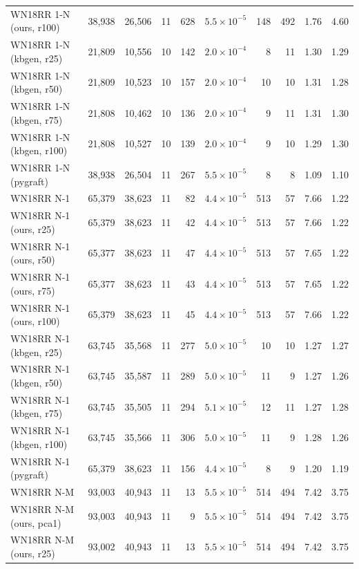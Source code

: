 \begin{tabular}{lrrrrrrrrr}
WN18RR 1-N (ours, r100) & 38{,}938 & 26{,}506 & 11 & 628 & $5.5\times10^{-5}$ & 148 & 492 & 1.76 & 4.60 \\
WN18RR 1-N (kbgen, r25) & 21{,}809 & 10{,}556 & 10 & 142 & $2.0\times10^{-4}$ & 8 & 11 & 1.30 & 1.29 \\
WN18RR 1-N (kbgen, r50) & 21{,}809 & 10{,}523 & 10 & 157 & $2.0\times10^{-4}$ & 10 & 10 & 1.31 & 1.28 \\
WN18RR 1-N (kbgen, r75) & 21{,}808 & 10{,}462 & 10 & 136 & $2.0\times10^{-4}$ & 9 & 11 & 1.31 & 1.30 \\
WN18RR 1-N (kbgen, r100) & 21{,}808 & 10{,}527 & 10 & 139 & $2.0\times10^{-4}$ & 9 & 10 & 1.29 & 1.30 \\
WN18RR 1-N (pygraft) & 38{,}938 & 26{,}504 & 11 & 267 & $5.5\times10^{-5}$ & 8 & 8 & 1.09 & 1.10 \\
\midrule
WN18RR N-1 & 65{,}379 & 38{,}623 & 11 & 82 & $4.4\times10^{-5}$ & 513 & 57 & 7.66 & 1.22 \\
WN18RR N-1 (ours, r25) & 65{,}379 & 38{,}623 & 11 & 42 & $4.4\times10^{-5}$ & 513 & 57 & 7.66 & 1.22 \\
WN18RR N-1 (ours, r50) & 65{,}377 & 38{,}623 & 11 & 47 & $4.4\times10^{-5}$ & 513 & 57 & 7.65 & 1.22 \\
WN18RR N-1 (ours, r75) & 65{,}377 & 38{,}623 & 11 & 43 & $4.4\times10^{-5}$ & 513 & 57 & 7.65 & 1.22 \\
WN18RR N-1 (ours, r100) & 65{,}379 & 38{,}623 & 11 & 45 & $4.4\times10^{-5}$ & 513 & 57 & 7.66 & 1.22 \\
WN18RR N-1 (kbgen, r25) & 63{,}745 & 35{,}568 & 11 & 277 & $5.0\times10^{-5}$ & 10 & 10 & 1.27 & 1.27 \\
WN18RR N-1 (kbgen, r50) & 63{,}745 & 35{,}587 & 11 & 289 & $5.0\times10^{-5}$ & 11 & 9 & 1.27 & 1.26 \\
WN18RR N-1 (kbgen, r75) & 63{,}745 & 35{,}505 & 11 & 294 & $5.1\times10^{-5}$ & 12 & 11 & 1.27 & 1.28 \\
WN18RR N-1 (kbgen, r100) & 63{,}745 & 35{,}566 & 11 & 306 & $5.0\times10^{-5}$ & 11 & 9 & 1.28 & 1.26 \\
WN18RR N-1 (pygraft) & 65{,}379 & 38{,}623 & 11 & 156 & $4.4\times10^{-5}$ & 8 & 9 & 1.20 & 1.19 \\
\midrule
WN18RR N-M & 93{,}003 & 40{,}943 & 11 & 13 & $5.5\times10^{-5}$ & 514 & 494 & 7.42 & 3.75 \\
WN18RR N-M (ours, pca1) & 93{,}003 & 40{,}943 & 11 & 9 & $5.5\times10^{-5}$ & 514 & 494 & 7.42 & 3.75 \\
WN18RR N-M (ours, r25) & 93{,}002 & 40{,}943 & 11 & 13 & $5.5\times10^{-5}$ & 514 & 494 & 7.42 & 3.75 \\

\end{tabular}
